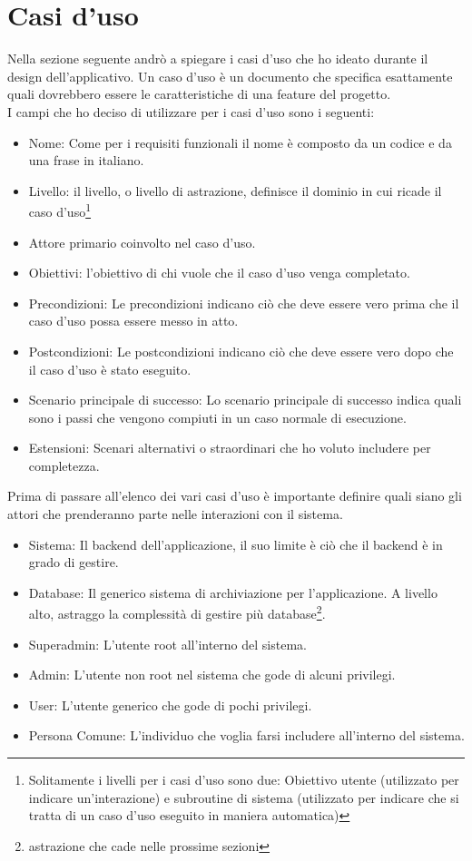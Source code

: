 \section{Casi d'uso}
Nella sezione seguente andrò a spiegare i casi d'uso che ho ideato durante il design dell'applicativo. Un caso d'uso è un documento che specifica esattamente quali dovrebbero essere le caratteristiche di una feature del progetto.
\\
I campi che ho deciso di utilizzare per i casi d'uso sono i seguenti:
\begin{itemize}
    \item Nome: Come per i requisiti funzionali il nome è composto da un codice e da una frase in italiano.
    \item Livello: il livello, o livello di astrazione, definisce il dominio in cui ricade il caso d'uso\footnote{Solitamente i livelli per i casi d'uso sono due: Obiettivo utente (utilizzato per indicare un'interazione) e subroutine di sistema (utilizzato per indicare che si tratta di un caso d'uso eseguito in maniera automatica)\cite{unifiCasiDUso}}
    \item Attore primario coinvolto nel caso d'uso.
    \item Obiettivi: l'obiettivo di chi vuole che il caso d'uso venga completato.
    \item Precondizioni: Le precondizioni indicano ciò che deve essere vero prima che il caso d'uso possa essere messo in atto.
    \item Postcondizioni: Le postcondizioni indicano ciò che deve essere vero dopo che il caso d'uso è stato eseguito.
    \item Scenario principale di successo: Lo scenario principale di successo indica quali sono i passi che vengono compiuti in un caso normale di esecuzione.
    \item Estensioni: Scenari alternativi o straordinari che ho voluto includere per completezza.
\end{itemize}
Prima di passare all'elenco dei vari casi d'uso è importante definire quali siano gli attori che prenderanno parte nelle interazioni con il sistema.
\begin{itemize}
    \item Sistema: Il backend dell'applicazione, il suo limite è ciò che il backend è in grado di gestire.
    \item Database: Il generico sistema di archiviazione per l'applicazione. A livello alto, astraggo la complessità di gestire più database\footnote{astrazione che cade nelle prossime sezioni}.
    \item Superadmin: L'utente root all'interno del sistema.
    \item Admin: L'utente non root nel sistema che gode di alcuni privilegi.
    \item User: L'utente generico che gode di pochi privilegi.
    \item Persona Comune: L'individuo che voglia farsi includere all'interno del sistema.
\end{itemize}
